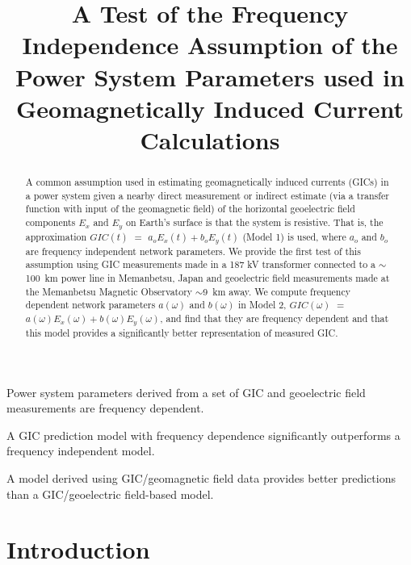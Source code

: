 \documentclass[draft,linenumbers]{agujournal2018}
\begin{document}

\title{A Test of the Frequency Independence Assumption of the Power System Parameters used in Geomagnetically Induced Current Calculations}





\begin{keypoints}
\item Power system parameters derived from a set of GIC and geoelectric field measurements are frequency dependent.
\item A GIC prediction model with frequency dependence significantly outperforms a frequency independent model.
\item A model derived using GIC/geomagnetic field data provides better predictions than a GIC/geoelectric field-based model.
\end{keypoints}

\begin{abstract}
A common assumption used in estimating geomagnetically induced currents (GICs) in a power system given a nearby direct measurement or indirect estimate (via a transfer function with input of the geomagnetic field) of the horizontal geoelectric field components $E_x$ and $E_y$ on Earth's surface is that the system is resistive. That is, the approximation $GIC(t)$  $=$ $a_oE_x(t) + b_oE_y(t)$ (Model 1) is used, where $a_o$ and $b_o$ are frequency independent network parameters.  We provide the first test of this assumption using GIC measurements made in a 187 kV transformer connected to a $\sim$100~km power line in Memanbetsu, Japan and geoelectric field measurements made at the Memanbetsu Magnetic Observatory $\sim$9~km away.  We compute frequency dependent network parameters $a(\omega)$ and $b(\omega)$ in Model 2, $GIC(\omega)$ $=$ $a(\omega)E_x(\omega) + b(\omega)E_y(\omega)$, and find that they are frequency dependent and that this model provides a significantly better representation of measured GIC.
\end{abstract}

\section{Introduction}
\end{document}
